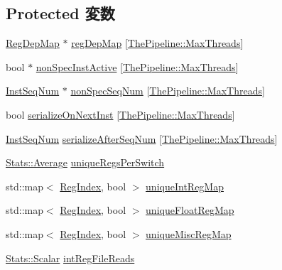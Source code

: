\subsection*{Protected 変数}
\begin{DoxyCompactItemize}
\item 
\hyperlink{classRegDepMap}{RegDepMap} $\ast$ \hyperlink{classUseDefUnit_aa0933c90c5ced66e85669c2982b165a6}{regDepMap} \mbox{[}\hyperlink{namespaceThePipeline_ac9c0bbe9cf27d93e08ea8ccc4096e633}{ThePipeline::MaxThreads}\mbox{]}
\item 
bool $\ast$ \hyperlink{classUseDefUnit_aa27d1c9b589af0c77a81c490021c7dcb}{nonSpecInstActive} \mbox{[}\hyperlink{namespaceThePipeline_ac9c0bbe9cf27d93e08ea8ccc4096e633}{ThePipeline::MaxThreads}\mbox{]}
\item 
\hyperlink{inst__seq_8hh_a258d93d98edaedee089435c19ea2ea2e}{InstSeqNum} $\ast$ \hyperlink{classUseDefUnit_a899b1bc10d38a0f725495bf2108479a3}{nonSpecSeqNum} \mbox{[}\hyperlink{namespaceThePipeline_ac9c0bbe9cf27d93e08ea8ccc4096e633}{ThePipeline::MaxThreads}\mbox{]}
\item 
bool \hyperlink{classUseDefUnit_ad4300fb3f2f2ddebbfd44bbcad133c56}{serializeOnNextInst} \mbox{[}\hyperlink{namespaceThePipeline_ac9c0bbe9cf27d93e08ea8ccc4096e633}{ThePipeline::MaxThreads}\mbox{]}
\item 
\hyperlink{inst__seq_8hh_a258d93d98edaedee089435c19ea2ea2e}{InstSeqNum} \hyperlink{classUseDefUnit_a699cfb06a053ac682026566662b62453}{serializeAfterSeqNum} \mbox{[}\hyperlink{namespaceThePipeline_ac9c0bbe9cf27d93e08ea8ccc4096e633}{ThePipeline::MaxThreads}\mbox{]}
\item 
\hyperlink{classStats_1_1Average}{Stats::Average} \hyperlink{classUseDefUnit_a796c1916448138c736618531476b9801}{uniqueRegsPerSwitch}
\item 
std::map$<$ \hyperlink{classUseDefUnit_a36d25e03e43fa3bb4c5482cbefe5e0fb}{RegIndex}, bool $>$ \hyperlink{classUseDefUnit_a007316fc06c43d3c786e79da6f3a5265}{uniqueIntRegMap}
\item 
std::map$<$ \hyperlink{classUseDefUnit_a36d25e03e43fa3bb4c5482cbefe5e0fb}{RegIndex}, bool $>$ \hyperlink{classUseDefUnit_a148e8f7c874a196ab74ca1f39662c98c}{uniqueFloatRegMap}
\item 
std::map$<$ \hyperlink{classUseDefUnit_a36d25e03e43fa3bb4c5482cbefe5e0fb}{RegIndex}, bool $>$ \hyperlink{classUseDefUnit_aeab2bd090cc9b29fbf5f386013dd79fd}{uniqueMiscRegMap}
\item 
\hyperlink{classStats_1_1Scalar}{Stats::Scalar} \hyperlink{classUseDefUnit_a67e958fedd10dfe72747865179154882}{intRegFileReads}

\end{DoxyCompactItemize}
